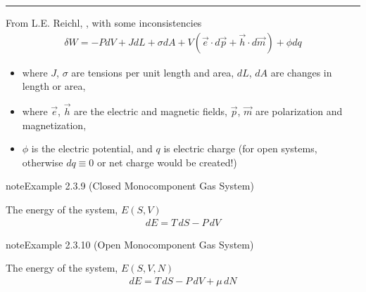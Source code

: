 \documentclass[letterpaper,10pt,english]{jupyterBook}
\begin{document}
\bigskip\hrule\bigskip


\sphinxAtStartPar
From L.E. Reichl, , with some inconsistencies  
\begin{equation*}
\begin{split}
\delta W = - P dV + J dL + \sigma d A + V \left( \vec{e} \cdot d \vec{p} + \vec{h} \cdot d \vec{m}\right) + \phi d q
\end{split}
\end{equation*}\begin{itemize}
\item {} 
\sphinxAtStartPar
where \( J \), \( \sigma \) are tensions per unit length and area, \( d L \), \( d A \) are changes in length or area,

\item {} 
\sphinxAtStartPar
where \( \vec{e} \), \( \vec{h} \) are the electric and magnetic fields, \( \vec{p} \), \( \vec{m} \) are polarization and magnetization,

\item {} 
\sphinxAtStartPar
\( \phi \) is the electric potential, and \( q \) is electric charge (for open systems, otherwise \( dq \equiv 0 \) or net charge would be created!)

\end{itemize}
\label{ch/principles-gibbs-phase-rule:example-12}
\begin{sphinxadmonition}{note}{Example 2.3.9 (Closed Monocomponent Gas System)}



\sphinxAtStartPar
The energy of the system, \( E(S,V) \)
\begin{equation*}
\begin{split}
dE = T \, dS - P \, dV
\end{split}
\end{equation*}\end{sphinxadmonition}
\label{ch/principles-gibbs-phase-rule:example-13}
\begin{sphinxadmonition}{note}{Example 2.3.10 (Open Monocomponent Gas System)}



\sphinxAtStartPar
The energy of the system, \( E(S,V,N) \)
\begin{equation*}
\begin{split}
dE = T \, dS - P \, dV + \mu \, dN
\end{split}
\end{equation*}\end{sphinxadmonition}
\end{document}
